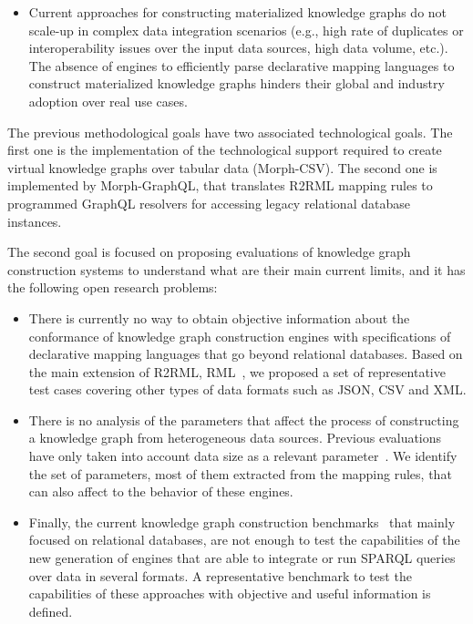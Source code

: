 \begin{itemize}
    \item Current approaches for constructing materialized knowledge graphs do not scale-up in complex data integration scenarios (e.g., high rate of duplicates or interoperability issues over the input data sources, high data volume, etc.). The absence of engines to efficiently parse declarative mapping languages to construct materialized knowledge graphs hinders their global and industry adoption over real use cases.
\end{itemize}

The previous methodological goals have two associated technological goals. The first one is the implementation of the technological support required to create virtual knowledge graphs over tabular data (Morph-CSV). The second one is implemented by Morph-GraphQL, that translates R2RML mapping rules to programmed GraphQL resolvers for accessing legacy relational database instances.

The second goal is focused on proposing evaluations of knowledge graph construction systems to understand what are their main current limits, and it has the following open research problems:
\begin{itemize}
    \item There is currently no way to obtain objective information about the conformance of knowledge graph construction engines with specifications of declarative mapping languages that go beyond relational databases. Based on the main extension of R2RML, RML~\citep{dimou2014rml}, we proposed a set of representative test cases covering other types of data formats such as JSON, CSV and XML.
    \item There is no analysis of the parameters that affect the process of constructing a knowledge graph from heterogeneous data sources. Previous evaluations have only taken into account data size as a relevant parameter~\citep{lefranccois2017sparql,csimcsek2019rocketrml}. We identify the set of parameters, most of them extracted from the mapping rules, that can also affect to the behavior of these engines.
    \item Finally, the current knowledge graph construction benchmarks~\citep{lanti2015npd,bizer2009berlin} that mainly focused on relational databases, are not enough to test the capabilities of the new generation of engines that are able to integrate or run SPARQL queries over data in several formats. A representative benchmark to test the capabilities of these approaches with objective and useful information is defined.
\end{itemize}



